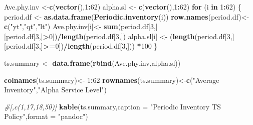 \documentclass[
]{article}
\newenvironment{Shaded}{\begin{snugshade}}{\end{snugshade}}
\newcommand{\CommentTok}[1]{\textcolor[rgb]{0.56,0.35,0.01}{\textit{#1}}}
\newcommand{\ControlFlowTok}[1]{\textcolor[rgb]{0.13,0.29,0.53}{\textbf{#1}}}
\newcommand{\DataTypeTok}[1]{\textcolor[rgb]{0.13,0.29,0.53}{#1}}
\newcommand{\DecValTok}[1]{\textcolor[rgb]{0.00,0.00,0.81}{#1}}
\newcommand{\KeywordTok}[1]{\textcolor[rgb]{0.13,0.29,0.53}{\textbf{#1}}}
\newcommand{\NormalTok}[1]{#1}
\newcommand{\OperatorTok}[1]{\textcolor[rgb]{0.81,0.36,0.00}{\textbf{#1}}}
\newcommand{\StringTok}[1]{\textcolor[rgb]{0.31,0.60,0.02}{#1}}
\begin{document}
\begin{Shaded}
\begin{Highlighting}[]
\NormalTok{Ave.phy.inv <-}\KeywordTok{c}\NormalTok{(}\KeywordTok{vector}\NormalTok{(),}\DecValTok{1}\OperatorTok{:}\DecValTok{62}\NormalTok{)}
\NormalTok{alpha.sl <-}\StringTok{ }\KeywordTok{c}\NormalTok{(}\KeywordTok{vector}\NormalTok{(),}\DecValTok{1}\OperatorTok{:}\DecValTok{62}\NormalTok{)}
\ControlFlowTok{for}\NormalTok{ (i }\ControlFlowTok{in} \DecValTok{1}\OperatorTok{:}\DecValTok{62}\NormalTok{) \{}
\NormalTok{  period.df <-}\StringTok{ }\KeywordTok{as.data.frame}\NormalTok{(}\KeywordTok{Periodic.inventory}\NormalTok{(i))}
  \KeywordTok{row.names}\NormalTok{(period.df)<-}\StringTok{ }\KeywordTok{c}\NormalTok{(}\StringTok{"yt"}\NormalTok{,}\StringTok{"qt"}\NormalTok{,}\StringTok{"lt"}\NormalTok{)}
\NormalTok{  Ave.phy.inv[i]<-}\StringTok{ }\KeywordTok{sum}\NormalTok{(period.df[}\DecValTok{3}\NormalTok{,][period.df[}\DecValTok{3}\NormalTok{,]}\OperatorTok{>}\DecValTok{0}\NormalTok{])}\OperatorTok{/}\KeywordTok{length}\NormalTok{(period.df[}\DecValTok{3}\NormalTok{,])}
\NormalTok{  alpha.sl[i] <-}\StringTok{ }\NormalTok{(}\KeywordTok{length}\NormalTok{(period.df[}\DecValTok{3}\NormalTok{,][period.df[}\DecValTok{3}\NormalTok{,]}\OperatorTok{>=}\DecValTok{0}\NormalTok{])}\OperatorTok{/}\KeywordTok{length}\NormalTok{(period.df[}\DecValTok{3}\NormalTok{,])) }\OperatorTok{*}\DecValTok{100}
\NormalTok{\}}

\NormalTok{ts.summary <-}\StringTok{ }\KeywordTok{data.frame}\NormalTok{(}\KeywordTok{rbind}\NormalTok{(Ave.phy.inv,alpha.sl))}

\KeywordTok{colnames}\NormalTok{(ts.summary)<-}\StringTok{ }\DecValTok{1}\OperatorTok{:}\DecValTok{62}
\KeywordTok{rownames}\NormalTok{(ts.summary)<-}\KeywordTok{c}\NormalTok{(}\StringTok{"Average Inventory"}\NormalTok{,}\StringTok{"Alpha Service Level"}\NormalTok{)}

\CommentTok{#[,c(1,17,18,50)]}
\KeywordTok{kable}\NormalTok{(ts.summary,}\DataTypeTok{caption =} \StringTok{"Periodic Inventory TS Policy"}\NormalTok{,}\DataTypeTok{format =} \StringTok{"pandoc"}\NormalTok{)}
\end{Highlighting}
\end{Shaded}
\end{document}
